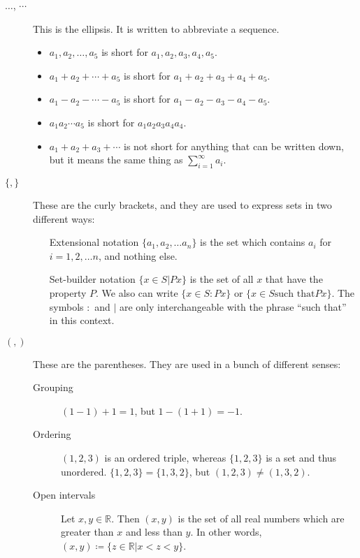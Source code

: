 \documentclass[12pt]{article}
\begin{document}
\begin{description}

  \item[$\ldots$, $\cdots$] This is the ellipsis.  It is written to
    abbreviate a sequence. 
    \begin{itemize}
      \item $a_1, a_2, \ldots , a_5$ is short for
        $a_1, a_2, a_3, a_4, a_5$. 
      \item $a_1+a_2+\cdots+a_5$ is short for $a_1+a_2+a_3+a_4+a_5$. 
      \item $a_1-a_2-\cdots-a_5$ is short for $a_1-a_2-a_3-a_4-a_5$. 
      \item $a_1a_2\cdots a_5$ is short for $a_1a_2a_3a_4a_4$. 
      \item $a_1+a_2+a_3+\cdots$ is not short for anything that can be
        written down, but it means the same thing as
        $\sum_{i=1}^\infty a_i$. 
    \end{itemize}
      
  \item[$\{,\}$] These are the curly brackets, and they are used to
    express sets in two different ways: 
    \begin{itemize}
      \item[Extensional notation] $\{a_1, a_2,\ldots a_n\}$ is
        the set which contains $a_i$ for $i=1,2,\ldots n$, and nothing
        else. 
      \item[Set-builder notation] $\{x\in S | Px \}$ is the set of all
        $x$ that have the property $P$. We also can write $\{x\in S :
        Px \}$ or $\{x\in S \textrm{such that} Px \}$.  The symbols
        $:$ and $|$ are only interchangeable with the phrase ``such
        that'' in this context. 
    \end{itemize}

  \item[$(,)$] These are the parentheses.  They are used in a bunch of
    different senses:
    \begin{description}
    \item[Grouping] $(1-1)+1=1$, but $1-(1+1)=-1$. 
    \item[Ordering] $(1,2,3)$ is an ordered triple, whereas
      $\{1,2,3\}$ is a set and thus unordered.  $\{1,2,3\}=\{1,3,2\}$,
      but $(1,2,3)\neq (1,3,2)$. 
    \item[Open intervals] Let $x,y\in\mathbb{R}$.  Then $(x,y)$ is the
      set of all real numbers which are greater than $x$ and less than
      $y$.  In other words, $(x,y)\coloneqq\{z\in\mathbb{R} | x<z<y
      \}$. 
    \end{description}
    

\end{description}
\end{document}
